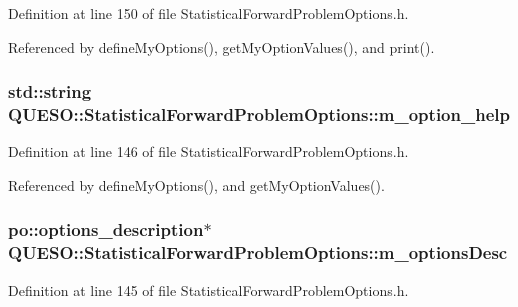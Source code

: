 Definition at line 150 of file Statistical\-Forward\-Problem\-Options.\-h.



Referenced by define\-My\-Options(), get\-My\-Option\-Values(), and print().

\hypertarget{class_q_u_e_s_o_1_1_statistical_forward_problem_options_a6a48a27ad2c386feb7807e0623573fc5}{
\subsubsection[{m\-\_\-option\-\_\-help}]{\setlength{\rightskip}{0pt plus 5cm}std\-::string Q\-U\-E\-S\-O\-::\-Statistical\-Forward\-Problem\-Options\-::m\-\_\-option\-\_\-help\hspace{0.3cm}{\ttfamily [private]}}}\label{class_q_u_e_s_o_1_1_statistical_forward_problem_options_a6a48a27ad2c386feb7807e0623573fc5}


Definition at line 146 of file Statistical\-Forward\-Problem\-Options.\-h.



Referenced by define\-My\-Options(), and get\-My\-Option\-Values().

\hypertarget{class_q_u_e_s_o_1_1_statistical_forward_problem_options_a8e7a0bd5657edc636cddd2f377d09501}{
\subsubsection[{m\-\_\-options\-Desc}]{\setlength{\rightskip}{0pt plus 5cm}po\-::options\-\_\-description$\ast$ Q\-U\-E\-S\-O\-::\-Statistical\-Forward\-Problem\-Options\-::m\-\_\-options\-Desc\hspace{0.3cm}{\ttfamily [private]}}}\label{class_q_u_e_s_o_1_1_statistical_forward_problem_options_a8e7a0bd5657edc636cddd2f377d09501}


Definition at line 145 of file Statistical\-Forward\-Problem\-Options.\-h.



